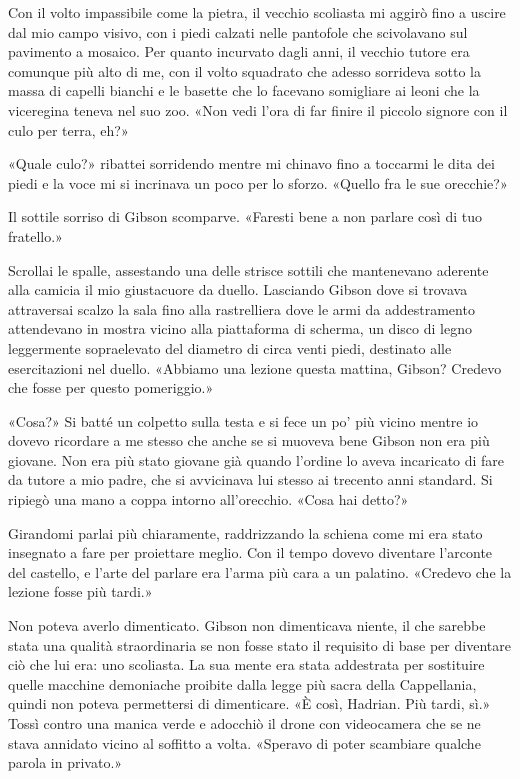 Con il volto impassibile come la pietra, il vecchio scoliasta mi aggirò
fino a uscire dal mio campo visivo, con i piedi calzati nelle pantofole
che scivolavano sul pavimento a mosaico. Per quanto incurvato dagli
anni, il vecchio tutore era comunque più alto di me, con il volto
squadrato che adesso sorrideva sotto la massa di capelli bianchi e le
basette che lo facevano somigliare ai leoni che la viceregina teneva nel
suo zoo. «Non vedi l'ora di far finire il piccolo signore con il culo
per terra, eh?»

«Quale culo?» ribattei sorridendo mentre mi chinavo fino a toccarmi le
dita dei piedi e la voce mi si incrinava un poco per lo sforzo. «Quello
fra le sue orecchie?»

Il sottile sorriso di Gibson scomparve. «Faresti bene a non parlare così
di tuo fratello.»

Scrollai le spalle, assestando una delle strisce sottili che mantenevano
aderente alla camicia il mio giustacuore da duello. Lasciando Gibson
dove si trovava attraversai scalzo la sala fino alla rastrelliera dove
le armi da addestramento attendevano in mostra vicino alla piattaforma
di scherma, un disco di legno leggermente sopraelevato del diametro di
circa venti piedi, destinato alle esercitazioni nel duello. «Abbiamo una
lezione questa mattina, Gibson? Credevo che fosse per questo
pomeriggio.»

«Cosa?» Si batté un colpetto sulla testa e si fece un po' più vicino
mentre io dovevo ricordare a me stesso che anche se si muoveva bene
Gibson non era più giovane. Non era più stato giovane già quando
l'ordine lo aveva incaricato di fare da tutore a mio padre, che si
avvicinava lui stesso ai trecento anni standard. Si ripiegò una mano a
coppa intorno all'orecchio. «Cosa hai detto?»

Girandomi parlai più chiaramente, raddrizzando la schiena come mi era
stato insegnato a fare per proiettare meglio. Con il tempo dovevo
diventare l'arconte del castello, e l'arte del parlare era l'arma più
cara a un palatino. «Credevo che la lezione fosse più tardi.»

Non poteva averlo dimenticato. Gibson non dimenticava niente, il che
sarebbe stata una qualità straordinaria se non fosse stato il requisito
di base per diventare ciò che lui era: uno scoliasta. La sua mente era
stata addestrata per sostituire quelle macchine demoniache proibite
dalla legge più sacra della Cappellania, quindi non poteva permettersi
di dimenticare. «È così, Hadrian. Più tardi, sì.» Tossì contro una
manica verde e adocchiò il drone con videocamera che se ne stava
annidato vicino al soffitto a volta. «Speravo di poter scambiare qualche
parola in privato.»

